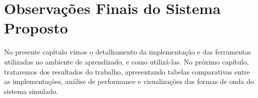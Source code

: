 \section{Observações Finais do Sistema Proposto}
    { No presente capítulo vimos o detalhamento da implementação e das ferramentas
        utilizadas no ambiente de aprendizado, e como utilizá-las. No próximo
        capítulo, trataremos dos resultados do trabalho, apresentando tabelas
        comparativas entre as implementações, análise de performance e visualizações
        das formas de onda do sistema simulado.
    }

